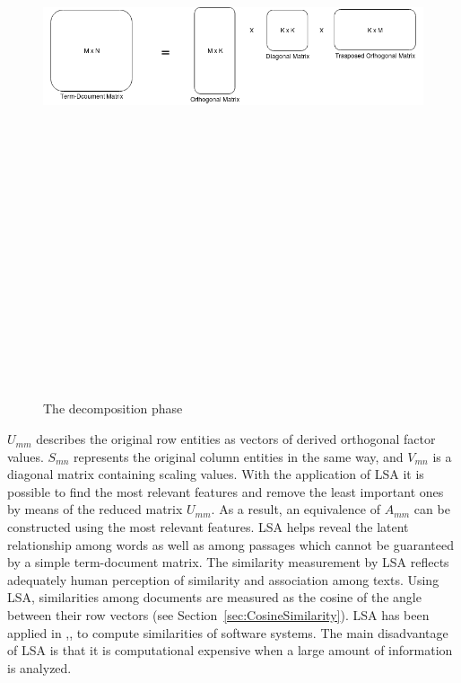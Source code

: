 \begin{figure}[h!]
	\centering
	\includegraphics[width=15cm,height=20cm,keepaspectratio]{images/LSIk.png}
	\caption{The decomposition phase}
	\label{fig:Decomposition}
\end{figure}


$U_{mm}$ describes the original row entities as vectors of derived orthogonal factor values. $S_{mn}$ represents the original column entities in the same way, and $V_{mn}$ is a diagonal matrix containing scaling values. With the application of LSA it is possible to find the most relevant features and remove the least important ones by means of the reduced matrix $U_{mm}$. As a result, an equivalence of $A_{mm}$ can be constructed using the most relevant features. LSA helps reveal the latent relationship among words as well as among passages which cannot be guaranteed by a simple term-document matrix. The similarity measurement by LSA reflects adequately human perception of similarity and association among texts. Using LSA, similarities among documents are measured as the cosine of the angle between their row vectors (see Section~\ref{sec:CosineSimilarity}). LSA has been applied in \cite{10.1109/APSEC.2004.69},\cite{10.1109ICPC.2016.7503721},\cite{McMillan:2012:DSS:2337223.2337267} to compute similarities of software systems. The main disadvantage of LSA is that it is computational expensive when a large amount of information is analyzed.


